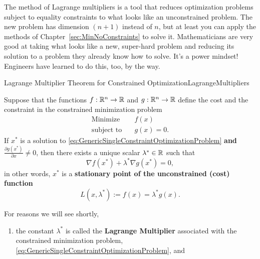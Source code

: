The method of Lagrange multipliers is a tool that reduces optimization problems subject to equality constraints to what looks like an unconstrained problem. The new problem has dimension $(n+1)$ instead of $n$, but at least you can apply the methods of Chapter~\ref{sec:MinNoConstraints} to solve it. Mathematicians are very good at taking what looks like a new, super-hard problem and reducing its solution to a problem they already know how to solve. It's a power mindset! Engineers have learned to do this, too, by the way.

\begin{propColor}{Lagrange Multiplier Theorem for Constrained Optimization}{LagrangeMultipliers}

Suppose that the functions $f:\mathbb R^n \to \mathbb R$ and $g:\mathbb R^n \to \mathbb R$ define the cost and the constraint in the constrained minimization problem 
\begin{equation}
\label{eq:GenericSingleConstraintOptimizationProblem}
\begin{aligned}
\text{Minimize} \quad & f(x)\\
\text{subject to} \quad & g(x) = 0.
\end{aligned}    
\end{equation}
If $x^\ast$ is a solution to \eqref{eq:GenericSingleConstraintOptimizationProblem} \textbf{and} $\frac{\partial g(x^\ast)}{\partial x} \neq 0$, then there exists a unique scalar $\lambda^\ast \in \mathbb R$ such that
\begin{equation}
\label{eq:EquivalentUnconstrainedOptimizationProblem01}
\nabla f(x^\ast) + \lambda^\ast \nabla g(x^\ast) = 0,
\end{equation}
in other words, $x^\ast$ is a \textbf{stationary point of the unconstrained (cost) function}
$$ L(x, \lambda^*):= f(x) = \lambda^\ast g(x).$$

\begin{rem}
For reasons we will see shortly, 
\begin{enumerate}
\renewcommand{\labelenumi}{(\alph{enumi})}
\setlength{\itemsep}{.2cm}

\item the constant $\lambda^\ast$ is called the \textbf{Lagrange Multiplier} associated with the constrained minimization problem, \eqref{eq:GenericSingleConstraintOptimizationProblem}, and 


\end{enumerate}
\end{rem}
\end{propColor}
